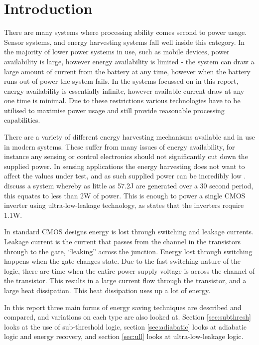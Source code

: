 \section{Introduction}
\label{sec:intro}
There are many systems where processing ability comes second to power usage.
Sensor systems, and energy harvesting systems fall well inside this category.
In the majority of lower power systems in use, such as mobile devices, power availability is large, however energy availability is limited - the system can draw a large amount of current from the battery at any time, however when the battery runs out of power the system fails.
In the systems focussed on in this report, energy availability is essentially infinite, however available current draw at any one time is minimal.
Due to these restrictions various technologies have to be utilised to maximise power usage and still provide reasonable processing capabilities.

There are a variety of different energy harvesting mechanisms available and in use in modern systems.
These suffer from many issues of energy availability, for instance any sensing or control electronics should not significantly cut down the supplied power.
In sensing applications the energy harvesting does not want to affect the values under test, and as such supplied power can be incredibly low \cite{ExperimentalHybridVibration,CMAirTurbine}.
\cite{ExperimentalHybridVibration} discuss a system whereby as little as 57.2\textmu J are generated over a 30 second period, this equates to less than 2\textmu W of power.
This is enough to power a single CMOS inverter using ultra-low-leakage technology, as \citeauthor{ULL-AandD} \cite{ULL-AandD} states that the inverters require 1.1\textmu W.

In standard CMOS designs energy is lost through switching and leakage currents.
Leakage current is the current that passes from the channel in the transistors through to the gate, ``leaking'' across the junction.
Energy lost through switching happens when the gate changes state.
Due to the fast switching nature of the logic, there are time when the entire power supply voltage is across the channel of the transistor.
This results in a large current flow through the transistor, and a large heat dissipation.
This heat dissipation uses up a lot of energy.

In this report three main forms of energy saving techniques are described and compared, and variations on each type are also looked at.
Section \ref{sec:subthresh} looks at the use of sub-threshold logic, section \ref{sec:adiabatic} looks at adiabatic logic and energy recovery, and section \ref{sec:ull} looks at ultra-low-leakage logic.
